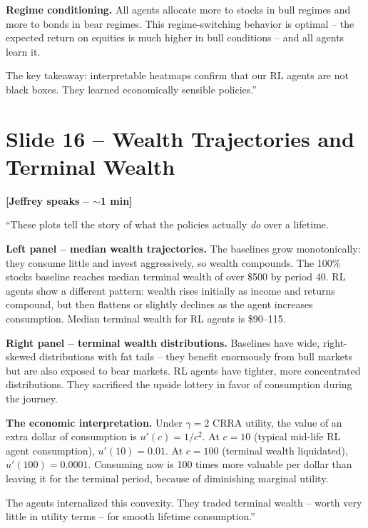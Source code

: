 \documentclass[11pt, letterpaper]{article}
\begin{document}
\textbf{Regime conditioning.} All agents allocate more to stocks in bull regimes and more to bonds in bear regimes. This regime-switching behavior is optimal -- the expected return on equities is much higher in bull conditions -- and all agents learn it.

The key takeaway: interpretable heatmaps confirm that our RL agents are not black boxes. They learned economically sensible policies.''

\section{Slide 16 -- Wealth Trajectories and Terminal Wealth}

\textbf{[Jeffrey speaks -- $\sim$1 min]}

``These plots tell the story of what the policies actually \emph{do} over a lifetime.

\textbf{Left panel -- median wealth trajectories.} The baselines grow monotonically: they consume little and invest aggressively, so wealth compounds. The 100\% stocks baseline reaches median terminal wealth of over \$500 by period 40. RL agents show a different pattern: wealth rises initially as income and returns compound, but then flattens or slightly declines as the agent increases consumption. Median terminal wealth for RL agents is \$90--115.

\textbf{Right panel -- terminal wealth distributions.} Baselines have wide, right-skewed distributions with fat tails -- they benefit enormously from bull markets but are also exposed to bear markets. RL agents have tighter, more concentrated distributions. They sacrificed the upside lottery in favor of consumption during the journey.

\textbf{The economic interpretation.} Under $\gamma = 2$ CRRA utility, the value of an extra dollar of consumption is $u'(c) = 1/c^2$. At $c = 10$ (typical mid-life RL agent consumption), $u'(10) = 0.01$. At $c = 100$ (terminal wealth liquidated), $u'(100) = 0.0001$. Consuming now is 100 times more valuable per dollar than leaving it for the terminal period, because of diminishing marginal utility.

The agents internalized this convexity. They traded terminal wealth -- worth very little in utility terms -- for smooth lifetime consumption.''

\end{document}
